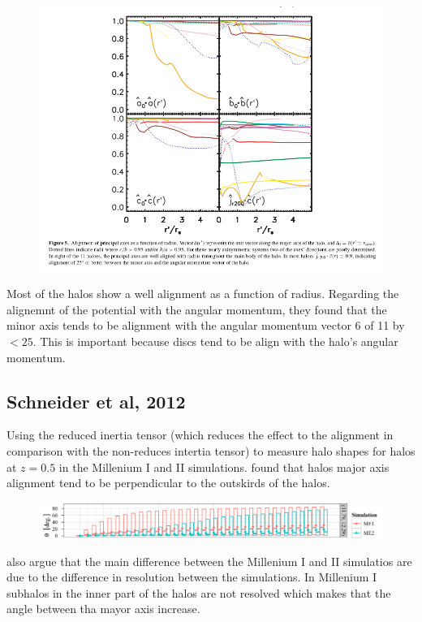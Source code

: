 \documentclass[12pt]{article}
\begin{document}
\begin{figure}
\includegraphics[scale=0.5]{alignmentH.png}
\end{figure}		

Most of the halos show a well alignment as a function of radius. 
Regarding the alignemnt of the potential with the angular momentum, they 
found that the minor axis tends to be alignment with the angular 
momentum vector 6 of 11 by $<25$. This is important because discs tend 
to be align with the halo's angular momentum. 

\subsection{Schneider et al, 2012}

Using the reduced inertia tensor (which reduces the effect to the alignment
in comparison with the non-reduces intertia tensor) to measure halo 
shapes for halos
at $z=0.5$ in the Millenium I and II simulations. \citep{scheider12}
found that halos major axis alignment tend to be perpendicular to the outskirds
of the halos.  

\begin{figure}[H]
\includegraphics[scale=0.5]{schneideralignments.png}
\end{figure}

\citep{schneider12} also argue that the main difference between the 
Millenium I and II simulatios are due to the difference in resolution 
between the simulations. In Millenium I subhalos in the inner part 
of the halos are not resolved which makes that the angle between 
tha mayor axis increase. 
\end{document}
